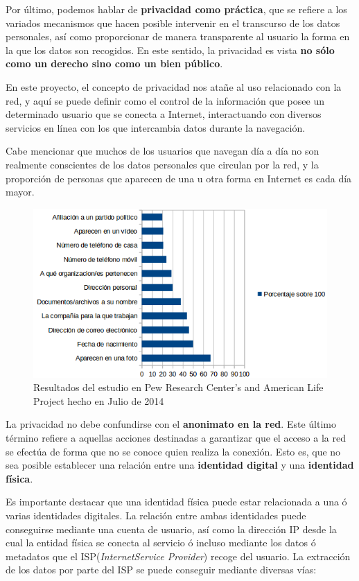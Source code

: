 Por último, podemos hablar de \textbf{privacidad como práctica}, que se refiere a los variados mecanismos que hacen posible intervenir en el transcurso de los datos personales, así como proporcionar de manera transparente al usuario la forma en la que los datos son recogidos. En este sentido, la privacidad es vista \textbf{no sólo como un derecho sino como un bien público}.~\cite{lane2014privacy}

En este proyecto, el concepto de privacidad nos atañe al uso relacionado con la red, y aquí se puede definir como el control de la información que posee un determinado usuario que se conecta a Internet, interactuando con diversos servicios en línea con los que intercambia datos durante la navegación. 

Cabe mencionar que muchos de los usuarios que navegan día a día no son realmente conscientes de los datos personales que circulan por la red, y la proporción de personas que aparecen de una u otra forma en Internet es cada día mayor.~\cite{article:concernidos} 

\begin{figure}[H]
	\centerline{
		\mbox{\includegraphics[width=5.00in]{images/chart_privacy.png}}
	}
	\caption{Resultados del estudio en Pew Research Center's and American Life Project hecho en Julio de 2014~\cite{article:pew} }
	\label{fig:estudioPew}
\end{figure}

La privacidad no debe confundirse con el \textbf{anonimato en la red}. Este último término refiere a aquellas acciones destinadas a garantizar que el acceso a la red se efectúa de forma que no se conoce quien realiza la conexión. Esto es, que no sea posible establecer una relación entre una \textbf{identidad digital} y una \textbf{identidad física}.

Es importante destacar que una identidad física puede estar relacionada a una ó varias identidades digitales. La relación entre ambas identidades puede conseguirse mediante una cuenta de usuario, así como la dirección IP desde la cual la entidad física se conecta al servicio ó incluso mediante los datos ó metadatos que el ISP(\textit{InternetService Provider}) recoge del usuario. La extracción de los datos por parte del ISP se puede conseguir mediante diversas vías:

